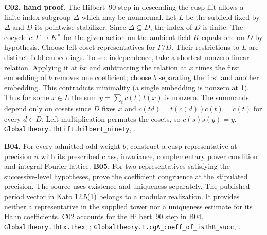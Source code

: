 \textbf{C02, hand proof.} The Hilbert~90 step in descending the cusp
lift allows a finite-index subgroup \(\Delta\) which may be nonnormal.
Let \(L\) be the subfield fixed by \(\Delta\) and \(D\) its pointwise
stabilizer. Since \(\Delta\subseteq D\), the index of \(D\) is finite. The cocycle \(c:\Gamma\to K^\times\) for the given action on the ambient field \(K\) equals one on \(D\)
by hypothesis. Choose left-coset representatives for \(\Gamma/D\).
Their restrictions to \(L\) are distinct field embeddings. To see
independence, take a shortest nonzero linear relation. Applying it at
\(bx\) and subtracting the relation at \(x\) times the first embedding
of \(b\) removes one coefficient; choose \(b\) separating the first and
another embedding. This contradicts minimality (a single embedding
is nonzero at 1). Thus for some \(x\in L\) the sum
\(y=\sum_t c(t)t(x)\) is nonzero. The summands depend only on
cosets since \(D\) fixes \(x\) and \(c(td)=t(c(d))c(t)=c(t)\) for every \(d\in D\).
Left multiplication permutes the cosets, so \(c(s)s(y)=y\).
\nolinkurl{GlobalTheory.ThLift.hilbert_ninety},
.

\textbf{B04.} For every admitted odd-weight \(b\), construct a cusp
representative at precision \(n\) with its prescribed class, invariance,
complementary power condition and integral Fourier lattice.
\textbf{B05.} For two representatives satisfying the successive-level
hypotheses, prove the coefficient congruence at the stipulated precision.
The source uses existence and uniqueness separately. The published
period vector in Kato 12.5(1) belongs to a modular realization. It
provides neither a representative in the supplied tower nor a uniqueness
estimate for its Hahn coefficients. C02 accounts for the Hilbert~90
step in B04.
\nolinkurl{GlobalTheory.ThEx.thex},
;
\nolinkurl{GlobalTheory.T.cgA_coeff_of_isThB_succ},
.

